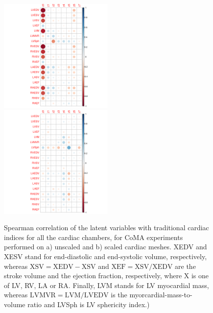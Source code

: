 \begin{figure}[ht!]
\includegraphics[width=0.5\textwidth]{figs/correlation/experiment_2_vs_cardiac_indices}
\includegraphics[width=0.5\textwidth]{figs/correlation/experiment_1_vs_cardiac_indices}
\caption{Spearman correlation of the latent variables with traditional cardiac indices for all the cardiac chambers, for CoMA experiments performed on a) unscaled and b) scaled cardiac meshes. XEDV and XESV stand for end-diastolic and end-systolic volume, respectively, whereas $\text{XSV}=\text{XEDV}-\text{XSV}$ and $\text{XEF}=\text{XSV}/\text{XEDV}$ are the stroke volume and the ejection fraction, respectively, where X is one of LV, RV, LA or RA. Finally, LVM stands for LV myocardial mass, whereas $\text{LVMVR}=\text{LVM}/\text{LVEDV}$ is the myorcardial-mass-to-volume ratio and LVSph is LV sphericity index.)}
\label{fig:relation_to_indices}
\end{figure}



